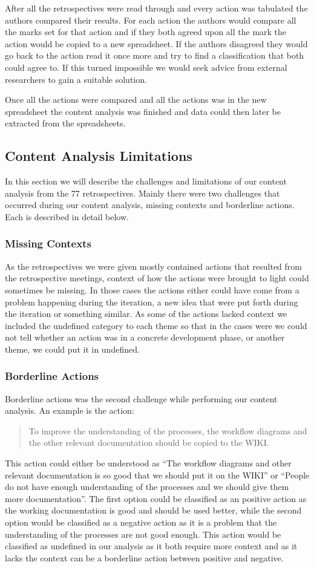 After all the retrospectives were read through and every action was tabulated the authors compared their results. For each action the authors would compare all the marks set for that action and if they both agreed upon all the mark the action would be copied to a new spreadsheet. If the authors disagreed they would go back to the action read it once more and try to find a classification that both could agree to. If this turned impossible we would seek advice from external researchers to gain a suitable solution. 

Once all the actions were compared and all the actions was in the new spreadsheet the content analysis was finished and data could then later be extracted from the spreadsheets. 

\subsection{Content Analysis Limitations}
In this section we will describe the challenges and limitations of our content analysis from the 77 retrospectives. Mainly there were two challenges that occurred during our content analysis, missing contexts and borderline actions. Each is described in detail below. 
\subsubsection{Missing Contexts}
As the retrospectives we were given mostly contained actions that resulted from the retrospective meetings, context of how the actions were brought to light could sometimes be missing. In those cases the actions either could have come from a problem happening during the iteration, a new idea that were put forth during the iteration or something similar. As some of the actions lacked context we included the undefined category to each theme so that in the cases were we could not tell whether an action was in a concrete development phase, or another theme, we could put it in undefined. 
\subsubsection{Borderline Actions}
Borderline actions was the second challenge while performing our content analysis. An example is the action: 
\begin{quote}
To improve the understanding of the processes, the workflow diagrams and the other relevant documentation should be copied to the WIKI.
\end{quote}
This action could either be understood as ``The workflow diagrams and other relevant documentation is so good that we should put it on the WIKI'' or ``People do not have enough understanding of the processes and we should give them more documentation''. The first option could be classified as an positive action as the working documentation is good and should be used better, while the second option would be classified as a negative action as it is a problem that the understanding of the processes are not good enough. This action would be classified as undefined in our analysis as it both require more context and as it lacks the context can be a borderline action between positive and negative. 

